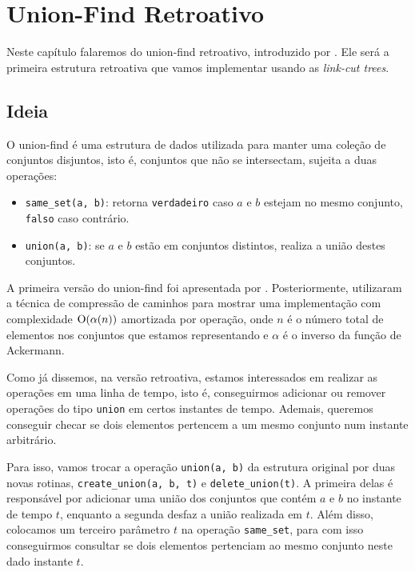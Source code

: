 
\chapter{Union-Find Retroativo}
\label{cap:union-find}

Neste capítulo falaremos do union-find retroativo, introduzido por \citet{10.1145/1240233.1240236}. Ele será a primeira estrutura retroativa que vamos implementar usando as \emph{link-cut trees}.

\section{Ideia}
\label{sec:uf-ideia}

O union-find é uma estrutura de dados utilizada para manter uma coleção de conjuntos disjuntos, isto é, conjuntos que não se intersectam, sujeita a duas operações:

\begin{itemize}
    \item \texttt{same\_set(a, b)}: retorna \texttt{verdadeiro} caso $a$ e $b$ estejam no mesmo conjunto, \texttt{falso} caso contrário.
    \item \texttt{union(a, b)}: se $a$ e $b$ estão em conjuntos distintos, realiza a união destes conjuntos.
\end{itemize}

A primeira versão do union-find foi apresentada por \citet{10.1145/364099.364331}. Posteriormente, \citet{10.1145/62.2160} utilizaram a técnica de compressão de caminhos para mostrar uma implementação com complexidade $\mathrm{O}( \alpha (n) )$ amortizada por operação, onde $n$ é o número total de elementos nos conjuntos que estamos representando e $\alpha$ é o inverso da função de Ackermann.

Como já dissemos, na versão retroativa, estamos interessados em realizar as operações em uma linha de tempo, isto é, conseguirmos adicionar ou remover operações do tipo \texttt{union} em certos instantes de tempo. Ademais, queremos conseguir checar se dois elementos pertencem a um mesmo conjunto num instante arbitrário.

Para isso, vamos trocar a operação \texttt{union(a, b)} da estrutura original por duas novas rotinas, \texttt{create\_union(a, b, t)} e \texttt{delete\_union(t)}. A primeira delas é responsável por adicionar uma união dos conjuntos que contém $a$ e $b$ no instante de tempo $t$, enquanto a segunda desfaz a união realizada em $t$. Além disso, colocamos um terceiro parâmetro $t$ na operação \texttt{same\_set}, para com isso conseguirmos consultar se dois elementos pertenciam ao mesmo conjunto neste dado instante $t$.

